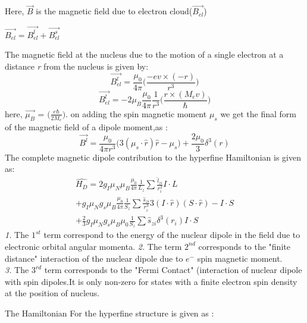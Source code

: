 \documentclass[%
 aapm,
 mph,%
 amsmath,amssymb,
 reprint,%
]{revtex4-2}
\begin{document}
Here, $\vec{B}$ is the magnetic field due to electron cloud($\vec{B_{el}}$)
\begin{center}
$\vec{B_{el}} = \vec{B^l_{el}} +\vec{B^s_{el}}$ 
\end{center}
The magnetic field at the nucleus due to the motion of a single electron at a distance \emph{r} from the nucleus is given by:
\begin{equation}
    \vec{B^l_{el}} = \frac{\mu_0}{4\pi} \Big( \frac{-ev\times(-r)}{r^3}\Big)
\end{equation}
\begin{equation}
    \vec{B^l_{el}} = -2\mu_B \frac{\mu_0}{4\pi} \frac{1}{r^3}\Big( \frac{r\times(M_ev)}{\hbar}\Big)
\end{equation}
here, $\vec{\mu_B}$ = $\big(\frac{e\hbar}{2M_e}\big)$. on adding the spin magnetic moment $\mu_s$ we get the final form of the magnetic field of a dipole moment,as \cite{Jackson:100964} :
\begin{equation}
    \vec{B^l} = \frac{\mu_0}{4\pi r^3}\Big(3(\mu_s \cdot \hat{r})\hat{r}-\mu_s \Big) +\frac{2\mu_0}{3}\delta^3(r)
\end{equation}
 The complete magnetic dipole contribution to the hyperfine Hamiltonian \cite{Soliverez_1980} is given as:\\
\begin{equation}
\begin{aligned}
\hat{H_D} = 2g_I\mu_N\mu_B\frac{\mu_0}{4\pi}\frac{1}{L_z}\sum\frac{\hat{l}_{zi}}{r^3_i}I\cdot L\\ + g_I\mu_N g_s\mu_B \frac{\mu_0}{4\pi} \frac{1}{S_z} \sum \frac{\hat{s}_{zi}} {r^3_i} {3(I\cdot \hat{r})(S \cdot \hat{r}) - I\cdot S} \\ + \frac{2}{3}g_I\mu_N g_s\mu_B\mu_0 \frac{1}{S_z}\sum \hat{s}_{zi}\delta^3(r_i)I\cdot S
\end{aligned}
\end{equation}
\emph{1.} The $1^{st}$ term correspond to the energy of the nuclear dipole in the field due to electronic orbital angular momenta. \emph{2.} The term $2^{nd}$ corresponds to the "finite distance" interaction of the nuclear dipole due to $e^-$ spin magnetic moment.\\
\emph{3.} The $3^{rd}$ term corresponds to the "Fermi Contact" (interaction of nuclear dipole with spin dipoles.It is only non-zero for states with a finite electron spin density at the position of nucleus. 

The Hamiltonian For the hyperfine structure is given as \cite{steck2003cesium}:
\end{document}
